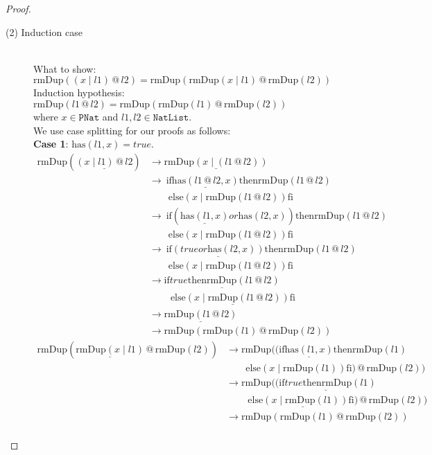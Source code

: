 \documentclass[12pt, a4paper]{article}
\newcommand{\rel}[1]{\mathrel{#1}}
\newcommand{\rmx}[1]{\mathrm{#1}}
\newcommand{\larrow}{\longrightarrow}
\newcommand{\under}{\underline}
\begin{document}
\begin{proof}
\begin{description}
\item[(2) Induction case]~\\
What to show: $\rmx{rmDup}((x \mid l1) \rel{@} l2) = \rmx{rmDup}(\rmx{rmDup}(x \mid l1) \rel{@} \rmx{rmDup}(l2))$\\
Induction hypothesis: $\rmx{rmDup}(l1 \rel{@} l2) = \rmx{rmDup}(\rmx{rmDup}(l1) \rel{@} \rmx{rmDup}(l2))$  \\
where $x \in \mathtt{PNat}$ and $l1, l2 \in \mathtt{NatList}$.\\
We use case splitting for our proofs as follows: \\
\textbf{Case 1}: $\rmx{has}(l1, x) = true$.
\begin{align*}
\rmx{rmDup}(\under{(x \mid l1) \rel{@} l2})
	&\larrow \under{\rmx{rmDup}(x \mid (l1 \rel{@} l2))} \tag{by @2} \\
	&\larrow\ \rel{\rmx{if}} \under{\rmx{has}(l1 \rel{@} l2, x)} \rel{\rmx{then}} \rmx{rmDup}(l1 \rel{@} l2) \\
	&\quad \quad \rel{\rmx{else}} (x \mid \rmx{rmDup}(l1 \rel{@} l2)) \rel{\rmx{fi}} \tag{by rmDup2} \\
	&\larrow\ \rel{\rmx{if}} (\under{\rmx{has}(l1, x)} \rel{or} \rmx{has}(l2, x)) \rel{\rmx{then}} \rmx{rmDup}(l1 \rel{@} l2) \\
	&\quad \quad \rel{\rmx{else}} (x \mid \rmx{rmDup}(l1 \rel{@} l2)) \rel{\rmx{fi}} \tag{by Problem 6 - Lemma 1} \\
	&\larrow\ \rel{\rmx{if}} \under{(true \rel{or} \rmx{has}(l2, x))} \rel{\rmx{then}} \rmx{rmDup}(l1 \rel{@} l2) \\
	&\quad \quad \rel{\rmx{else}} (x \mid \rmx{rmDup}(l1 \rel{@} l2)) \rel{\rmx{fi}} \tag{by case splitting} \\
	&\larrow \under{\rel{\rmx{if}} true \rel{\rmx{then}} \rmx{rmDup}(l1 \rel{@} l2)} \\
	&\quad \quad\ \under{\rel{\rmx{else}} (x \mid \rmx{rmDup}(l1 \rel{@} l2)) \rel{\rmx{fi}}} \tag{by or} \\
	&\larrow \under{\rmx{rmDup}(l1 \rel{@} l2)} \tag{by if1} \\
	&\larrow \rmx{rmDup}(\rmx{rmDup}(l1) \rel{@} \rmx{rmDup}(l2)) \tag{by IH}
\end{align*}
\begin{align*}
\rmx{rmDup}(\under{\rmx{rmDup}(x \mid l1)} \rel{@} \rmx{rmDup}(l2))
	&\larrow \rmx{rmDup}((\rel{\rmx{if}} \under{\rmx{has}(l1, x)} \rel{\rmx{then}} \rmx{rmDup}(l1) \\
	&\quad \quad \rel{\rmx{else}} (x \mid \rmx{rmDup}(l1)) \rel{\rmx{fi}}) \rel{@} \rmx{rmDup}(l2)) \tag{by rmDup2} \\
	&\larrow \rmx{rmDup}(\under{(\rel{\rmx{if}} true \rel{\rmx{then}} \rmx{rmDup}(l1)} \\
	&\quad \quad\ \under{\rel{\rmx{else}} (x \mid \rmx{rmDup}(l1)) \rel{\rmx{fi}})} \rel{@} \rmx{rmDup}(l2)) \tag{by case splitting} \\
	&\larrow \rmx{rmDup}(\rmx{rmDup}(l1) \rel{@} \rmx{rmDup}(l2)) \tag{by if1} \\
\end{align*}


\end{description}
\end{proof}
\end{document}
